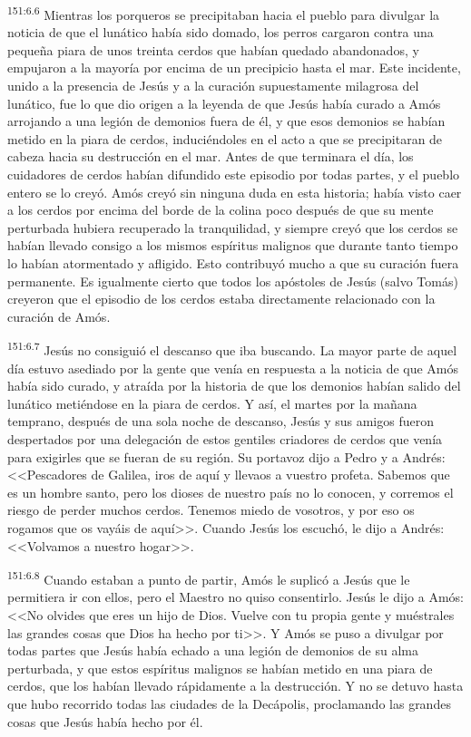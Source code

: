 \par 
\textsuperscript{151:6.6} Mientras los porqueros se precipitaban hacia el pueblo para divulgar la noticia de que el lunático había sido domado, los perros cargaron contra una pequeña piara de unos treinta cerdos que habían quedado abandonados, y empujaron a la mayoría por encima de un precipicio hasta el mar. Este incidente, unido a la presencia de Jesús y a la curación supuestamente milagrosa del lunático, fue lo que dio origen a la leyenda de que Jesús había curado a Amós arrojando a una legión de demonios fuera de él, y que esos demonios se habían metido en la piara de cerdos, induciéndoles en el acto a que se precipitaran de cabeza hacia su destrucción en el mar. Antes de que terminara el día, los cuidadores de cerdos habían difundido este episodio por todas partes, y el pueblo entero se lo creyó. Amós creyó sin ninguna duda en esta historia; había visto caer a los cerdos por encima del borde de la colina poco después de que su mente perturbada hubiera recuperado la tranquilidad, y siempre creyó que los cerdos se habían llevado consigo a los mismos espíritus malignos que durante tanto tiempo lo habían atormentado y afligido. Esto contribuyó mucho a que su curación fuera permanente. Es igualmente cierto que todos los apóstoles de Jesús (salvo Tomás) creyeron que el episodio de los cerdos estaba directamente relacionado con la curación de Amós.

\par 
\textsuperscript{151:6.7} Jesús no consiguió el descanso que iba buscando. La mayor parte de aquel día estuvo asediado por la gente que venía en respuesta a la noticia de que Amós había sido curado, y atraída por la historia de que los demonios habían salido del lunático metiéndose en la piara de cerdos. Y así, el martes por la mañana temprano, después de una sola noche de descanso, Jesús y sus amigos fueron despertados por una delegación de estos gentiles criadores de cerdos que venía para exigirles que se fueran de su región. Su portavoz dijo a Pedro y a Andrés: <<Pescadores de Galilea, iros de aquí y llevaos a vuestro profeta. Sabemos que es un hombre santo, pero los dioses de nuestro país no lo conocen, y corremos el riesgo de perder muchos cerdos. Tenemos miedo de vosotros, y por eso os rogamos que os vayáis de aquí>>. Cuando Jesús los escuchó, le dijo a Andrés: <<Volvamos a nuestro hogar>>.

\par 
\textsuperscript{151:6.8} Cuando estaban a punto de partir, Amós le suplicó a Jesús que le permitiera ir con ellos, pero el Maestro no quiso consentirlo. Jesús le dijo a Amós: <<No olvides que eres un hijo de Dios. Vuelve con tu propia gente y muéstrales las grandes cosas que Dios ha hecho por ti>>. Y Amós se puso a divulgar por todas partes que Jesús había echado a una legión de demonios de su alma perturbada, y que estos espíritus malignos se habían metido en una piara de cerdos, que los habían llevado rápidamente a la destrucción. Y no se detuvo hasta que hubo recorrido todas las ciudades de la Decápolis, proclamando las grandes cosas que Jesús había hecho por él.
